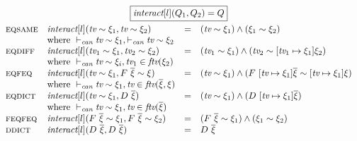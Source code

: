 \documentclass{article}
\newcommand{\multi}[1]{{\overline{#1}}}
\newcommand{\rulen}[1]{\textsc{#1}}
\begin{document}
\[
\begin{array}{llcl}
\multicolumn{4}{c}{\framebox{$\interact{l}{Q_1, Q_2} = Q$}} \\
\\[-3mm]

\rulen{eqsame} & \interact{l}{\textit{tv} \sim \xi_1, \textit{tv} \sim \xi_2}     & = & (\textit{tv} \sim \xi_1) \land (\xi_1 \sim \xi_2) \\
               & \text{where} ~ \vdash_\textit{can} \textit{tv} \sim \xi_1, \vdash_\textit{can} \textit{tv} \sim \xi_2 \\
\rulen{eqdiff} & \interact{l}{\textit{tv}_1 \sim \xi_1, \textit{tv}_2 \sim \xi_2} & = & (\textit{tv}_1 \sim \xi_1) \land (\textit{tv}_2 \sim [\textit{tv}_1 \mapsto \xi_1] \xi_2) \\
               & \text{where} ~ \vdash_\textit{can} \textit{tv} \sim \xi_i, \textit{tv}_1 \in \textit{ftv}(\xi_2) \\
\rulen{eqfeq}  & \interact{l}{\textit{tv} \sim \xi_1, F ~ \multi{\xi} \sim \xi}   & = & (\textit{tv} \sim \xi_1) \land (F ~ [\textit{tv} \mapsto \xi_1]\multi{\xi} \sim [\textit{tv} \mapsto \xi_1]\xi) \\
               & \text{where} ~ \vdash_\textit{can} \textit{tv} \sim \xi_1, \textit{tv} \in \textit{ftv}(\multi{\xi}, \xi) \\
\rulen{eqdict} & \interact{l}{\textit{tv} \sim \xi_1, D ~ \multi{\xi}}            & = & (\textit{tv} \sim \xi_1) \land (D ~ [\textit{tv} \mapsto \xi_1]\multi{\xi}) \\
               & \text{where} ~ \vdash_\textit{can} \textit{tv} \sim \xi_1, \textit{tv} \in \textit{ftv}(\multi{\xi}) \\
\rulen{feqfeq} & \interact{l}{F ~ \multi{\xi} \sim \xi_1, F ~ \multi{\xi} \sim \xi_2}        & = & (F ~ \multi{\xi} \sim \xi_1) \land (\xi_1 \sim \xi_2) \\
\rulen{ddict}  & \interact{l}{D ~ \multi{\xi}, D ~ \multi{\xi}}                   & = & D ~ \multi{\xi} \\
\end{array}
\]
\end{document}
